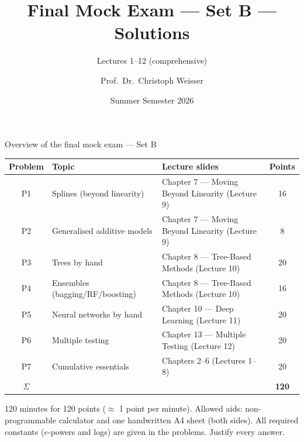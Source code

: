 \documentclass[aspectratio=169,11pt]{beamer}
\title{Final Mock Exam --- Set B --- Solutions}
\subtitle{Lectures 1--12 (comprehensive)}
\author{Prof.\ Dr.\ Christoph Weisser}\institute{Quantitative Research Methods \textperiodcentered\ HSBI}
\date{Summer Semester 2026}\graphicspath{{images/}}
\begin{document}
\begin{frame}[plain]\titlepage\end{frame}

\begin{frame}{Overview of the final mock exam --- Set B}
  \scriptsize
  \begin{center}
  \begin{tabular}{@{}cllc@{}}
    \toprule
    \textbf{Problem} & \textbf{Topic} & \textbf{Lecture slides} & \textbf{Points}\\
    \midrule
    P1 & Splines (beyond linearity)        & Chapter 7 --- Moving Beyond Linearity (Lecture 9)  & 16\\
    P2 & Generalised additive models       & Chapter 7 --- Moving Beyond Linearity (Lecture 9)  & 8\\
    P3 & Trees by hand                     & Chapter 8 --- Tree-Based Methods (Lecture 10)      & 20\\
    P4 & Ensembles (bagging/RF/boosting)   & Chapter 8 --- Tree-Based Methods (Lecture 10)      & 16\\
    P5 & Neural networks by hand           & Chapter 10 --- Deep Learning (Lecture 11)          & 20\\
    P6 & Multiple testing                  & Chapter 13 --- Multiple Testing (Lecture 12)       & 20\\
    P7 & Cumulative essentials             & Chapters 2--6 (Lectures 1--8)                      & 20\\
    \midrule
    $\Sigma$ & & & \textbf{120}\\
    \bottomrule
  \end{tabular}
  \end{center}
  \vspace{2pt}
  \begin{takeaway}
    120 minutes for 120 points ($\approx$ 1 point per minute). Allowed aids: non-programmable
    calculator and one handwritten A4 sheet (both sides). All required constants ($e$-powers
    and logs) are given in the problems. Justify every answer.
  \end{takeaway}
\end{frame}
\end{document}
